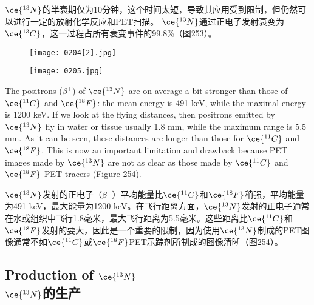 \documentclass[dvipsnames, svgnames,a4paper,11pt]{article}
\begin{document}
\(\ce{^{13}N}\)的半衰期仅为10分钟，这个时间太短，导致其应用受到限制，但仍然可以进行一定的放射化学反应和PET扫描。 \(\ce{^{13}N}\)通过正电子发射衰变为\(\ce{^{13}C}\)，这一过程占所有衰变事件的99.8\%（图253）。

\begin{figure}[h]
	\centering
    \texttt{[image: 0204[2].jpg]}  
     \label{fig253}
\end{figure}

\begin{figure}[h]
	\centering
    \texttt{[image: 0205.jpg]}  
     \label{fig254}
\end{figure}

The positrons (\(\beta^+\)) of \(\ce{^{13}N}\) are on average a bit stronger than those of \(\ce{^{11}C}\) and \(\ce{^{18}F}\): the mean energy is 491 keV, while the maximal energy is 1200 keV. If we look at the flying distances, then positrons emitted by \(\ce{^{13}N}\) fly in water or tissue usually 1.8 mm, while the maximum range is 5.5 mm. As it can be seen, these distances are longer than those for \(\ce{^{11}C}\) and \(\ce{^{18}F}\). This is now an important limitation and drawback because PET images made by \(\ce{^{13}N}\) are not as clear as those made by \(\ce{^{11}C}\) and \(\ce{^{18}F}\) PET tracers (Figure 254).

\(\ce{^{13}N}\)发射的正电子（\(\beta^+\)）平均能量比\(\ce{^{11}C}\)和\(\ce{^{18}F}\)稍强，平均能量为491 keV，最大能量为1200 keV。在飞行距离方面，\(\ce{^{13}N}\)发射的正电子通常在水或组织中飞行1.8毫米，最大飞行距离为5.5毫米。这些距离比\(\ce{^{11}C}\)和\(\ce{^{18}F}\)发射的要大，因此是一个重要的限制，因为使用\(\ce{^{13}N}\)制成的PET图像通常不如\(\ce{^{11}C}\)或\(\ce{^{18}F}\)PET示踪剂所制成的图像清晰（图254）。



\subsection{Production of \(\ce{^{13}N}\)\\ \(\ce{^{13}N}\)的生产}  
\end{document}
